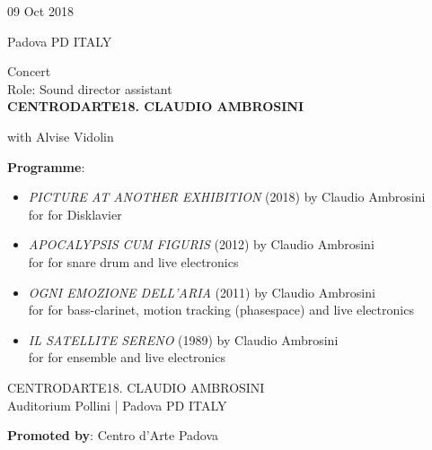 \documentclass[7pt,a4paper]{article}
\begin{document}
\begin{mdframed}[
    backgroundcolor=white,
    linecolor=white,
    linewidth=0pt,
    innerleftmargin=6pt,
    innerrightmargin=6pt,
    innertopmargin=6pt,
    innerbottommargin=6pt,
    skipabove=0pt,
    skipbelow=0pt
]

\begin{minipage}[t]{0.28\textwidth}

09 Oct 2018

\scriptsize Padova PD ITALY


\end{minipage}
\begin{minipage}[t]{0.68\textwidth}
\small Concert
\\\scriptsize Role: Sound director assistant
\\ \normalsize \textbf{CENTRODARTE18. CLAUDIO AMBROSINI}

\par\scriptsize with Alvise Vidolin
\vspace{0.25cm}

\par \scriptsize \textbf{Programme}:\par
\begin{itemize}

\item \textit{PICTURE AT ANOTHER EXHIBITION} (2018) by Claudio Ambrosini\\ for for Disklavier

\item \textit{APOCALYPSIS CUM FIGURIS} (2012) by Claudio Ambrosini\\ for for snare drum and live electronics

\item \textit{OGNI EMOZIONE DELL’ARIA} (2011) by Claudio Ambrosini\\ for for bass-clarinet, motion tracking (phasespace) and live electronics

\item \textit{IL SATELLITE SERENO} (1989) by Claudio Ambrosini\\ for  for ensemble and live electronics

\end{itemize}
\vspace{0.2cm}



\small CENTRODARTE18. CLAUDIO AMBROSINI\\Auditorium Pollini | \scriptsize Padova PD ITALY

\vspace{0.1cm}
\scriptsize

\vspace{0.1cm}
\par \textbf{Promoted by}: Centro d'Arte Padova
\end{minipage}
\vspace{0.25cm}
\end{mdframed}
\end{document}
